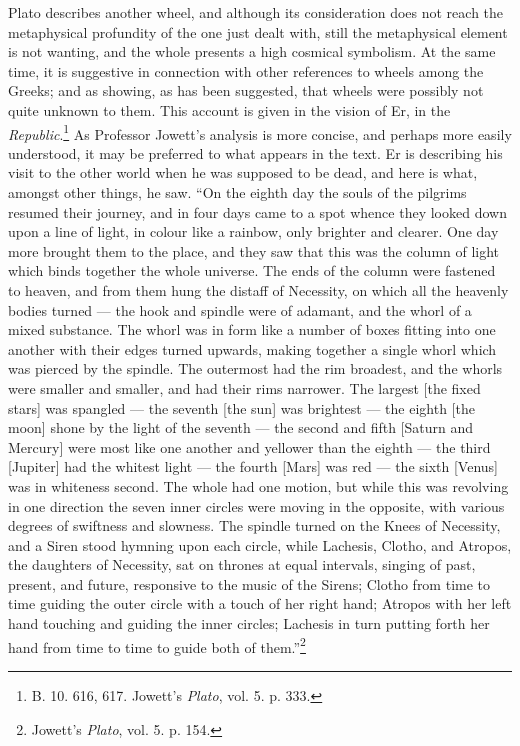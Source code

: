\documentclass[a4paper, 11pt, oneside, polutonikogreek, english]{article}
\begin{document}
Plato describes another wheel, and although its consideration does not reach the metaphysical profundity of the one just dealt with, still the metaphysical element is not wanting, and the whole presents a high cosmical symbolism. At the same time, it is suggestive in connection with other references to wheels among the Greeks; and as showing, as has been suggested, that wheels were possibly not quite unknown to them. This account is given in the vision of Er, in the \emph{Republic}.\footnote{B. 10. 616, 617. Jowett's \emph{Plato}, vol. 5. p. 333.} As Professor Jowett's analysis is more concise, and perhaps more easily understood, it may be preferred to what appears in the text. Er is describing his visit to the other world when he was supposed to be dead, and here is what, amongst other things, he saw. ``On the eighth day the souls of the pilgrims resumed their journey, and in four days came to a spot whence they looked down upon a line of light, in colour like a rainbow, only brighter and clearer. One day more brought them to the place, and they saw that this was the column of light which binds together the whole universe. The ends of the column were fastened to heaven, and from them hung the distaff of Necessity, on which all the heavenly bodies turned --- the hook and spindle were of adamant, and the whorl of a mixed substance. The whorl was in form like a number of boxes fitting into one another with their edges turned upwards, making together a single whorl which was pierced by the spindle. The outermost had the rim broadest, and the whorls were smaller and smaller, and had their rims narrower. The largest [the fixed stars] was spangled --- the seventh [the sun] was brightest --- the eighth [the moon] shone by the light of the seventh --- the second and fifth [Saturn and Mercury] were most like one another and yellower than the eighth --- the third [Jupiter] had the whitest light --- the fourth [Mars] was red --- the sixth [Venus] was in whiteness second. The whole had one motion, but while this was revolving in one direction the seven inner circles were moving in the opposite, with various degrees of swiftness and slowness. The spindle turned on the Knees of Necessity, and a Siren stood hymning upon each circle, while Lachesis, Clotho, and Atropos, the daughters of Necessity, sat on thrones at equal intervals, singing of past, present, and future, responsive to the music of the Sirens; Clotho from time to time guiding the outer circle with a touch of her right hand; Atropos with her left hand touching and guiding the inner circles; Lachesis in turn putting forth her hand from time to time to guide both of them.''\footnote{Jowett's \emph{Plato}, vol. 5. p. 154.}
\end{document}
